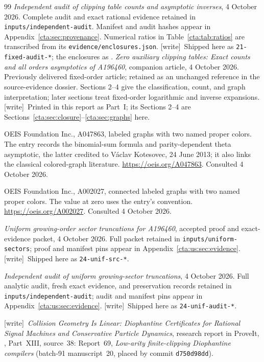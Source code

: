 \documentclass[11pt]{article}
\theoremstyle{definition}
\theoremstyle{remark}
\newcommand{\wtag}{\textup{[write]}}
\begin{document}
\begin{thebibliography}{99}
\emph{Independent audit of clipping table counts and asymptotic inverses},
4 October 2026. Complete audit and exact rational evidence retained in
\texttt{inputs/independent-audit}. Manifest and audit hashes appear in
Appendix~\ref{cta:sec:provenance}. Numerical ratios in Table~\ref{cta:tab:ratios}
are transcribed from its \texttt{evidence/enclosures.json}.
\wtag\ Shipped here as \texttt{21-fixed-audit-*}; the enclosures as
.
\emph{Zero auxiliary clipping tables: Exact counts and all orders
asymptotics of A196460}, companion article, 4 October 2026. Previously
delivered fixed-order article; retained as an unchanged reference in
the source-evidence dossier. Sections 2--4 give the classification,
count, and graph interpretation; later sections treat fixed-order
logarithmic and inverse expansions.
\wtag\ Printed in this report as Part~I; its Sections 2--4 are
Sections~\ref{cta:sec:closure}--\ref{cta:sec:graphs} here.

OEIS Foundation Inc., A047863, labeled graphs with two named proper
colors. The entry records the binomial-sum formula and parity-dependent
theta asymptotic, the latter credited to V\'aclav Kotesovec,
24 June 2013; it also links the classical colored-graph literature.
\url{https://oeis.org/A047863}. Consulted 4 October 2026.

OEIS Foundation Inc., A002027, connected labeled graphs with two
named proper colors. The value at zero uses the entry's convention.
\url{https://oeis.org/A002027}. Consulted 4 October 2026.

\emph{Uniform growing-order sector truncations for A196460},
accepted proof and exact-evidence packet, 4 October 2026.
Full packet retained in \texttt{inputs/uniform-sectors}; proof and
manifest pins appear in Appendix~\ref{cta:us:sec:evidence}.
\wtag\ Shipped here as \texttt{24-unif-src-*}.

\emph{Independent audit of uniform growing-sector truncations},
4 October 2026. Full analytic audit, fresh exact evidence, and
preservation records retained in \texttt{inputs/independent-audit};
audit and manifest pins appear in Appendix~\ref{cta:us:sec:evidence}.
\wtag\ Shipped here as \texttt{24-unif-audit-*}.

\wtag\ \emph{Collision Geometry Is Linear: Diophantine Certificates for
Rational Signal Machines and Conservative Particle Dynamics}, research
report in ProveIt,
,
Part~XIII, source~38: Report~69, \emph{Low-arity finite-clipping
Diophantine compilers} (batch-91 manuscript~20, placed by commit
\texttt{d750d98dd}).


\end{thebibliography}
\end{document}
